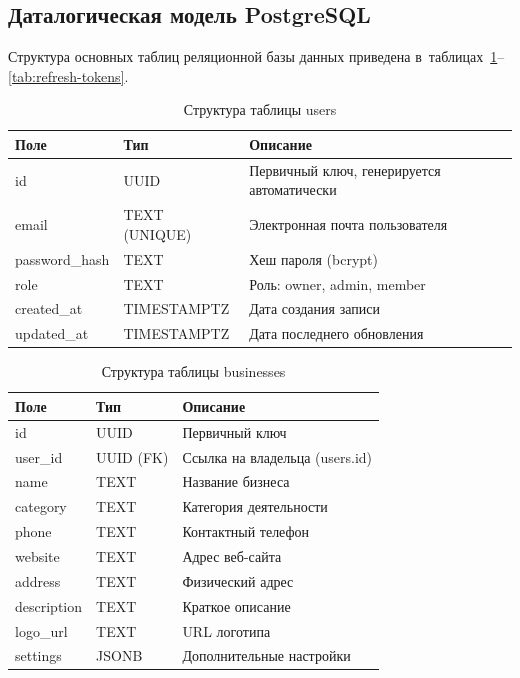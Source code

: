 \subsection{Даталогическая модель PostgreSQL}
\label{subsec:pg-schema}

Структура основных таблиц реляционной базы данных приведена в~таблицах~\ref{tab:users}--\ref{tab:refresh-tokens}.

\begin{table}[H]
  \caption{Структура таблицы users}
  \label{tab:users}
  \small
  \begin{tabularx}{\textwidth}{|p{3cm}|p{3.5cm}|X|}
    \hline
    \textbf{Поле} & \textbf{Тип} & \textbf{Описание} \\
    \hline
    id & UUID & Первичный ключ, генерируется автоматически \\
    \hline
    email & TEXT (UNIQUE) & Электронная почта пользователя \\
    \hline
    password\_hash & TEXT & Хеш пароля (bcrypt) \\
    \hline
    role & TEXT & Роль: owner, admin, member \\
    \hline
    created\_at & TIMESTAMPTZ & Дата создания записи \\
    \hline
    updated\_at & TIMESTAMPTZ & Дата последнего обновления \\
    \hline
  \end{tabularx}
\end{table}

\begin{table}[H]
  \caption{Структура таблицы businesses}
  \label{tab:businesses}
  \small
  \begin{tabularx}{\textwidth}{|p{3cm}|p{3cm}|X|}
    \hline
    \textbf{Поле} & \textbf{Тип} & \textbf{Описание} \\
    \hline
    id & UUID & Первичный ключ \\
    \hline
    user\_id & UUID (FK) & Ссылка на владельца (users.id) \\
    \hline
    name & TEXT & Название бизнеса \\
    \hline
    category & TEXT & Категория деятельности \\
    \hline
    phone & TEXT & Контактный телефон \\
    \hline
    website & TEXT & Адрес веб-сайта \\
    \hline
    address & TEXT & Физический адрес \\
    \hline
    description & TEXT & Краткое описание \\
    \hline
    logo\_url & TEXT & URL логотипа \\
    \hline
    settings & JSONB & Дополнительные настройки \\
    \hline
  \end{tabularx}
\end{table}


